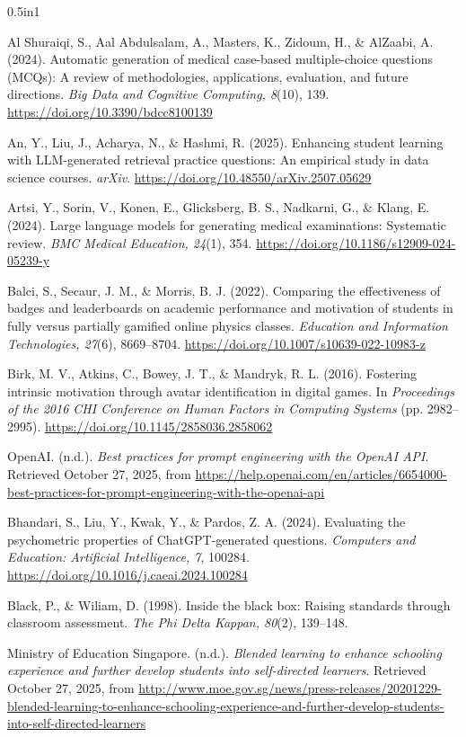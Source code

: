 \documentclass[
  12pt,
  a4paper,
]{report}
\begin{document}
\begingroup
\begin{hangparas}{0.5in}{1}

Al Shuraiqi, S., Aal Abdulsalam, A., Masters, K., Zidoum, H., \& AlZaabi, A. (2024). Automatic generation of medical case-based multiple-choice questions (MCQs): A review of methodologies, applications, evaluation, and future directions. \textit{Big Data and Cognitive Computing, 8}(10), 139. \url{https://doi.org/10.3390/bdcc8100139}

An, Y., Liu, J., Acharya, N., \& Hashmi, R. (2025). Enhancing student learning with LLM-generated retrieval practice questions: An empirical study in data science courses. \textit{arXiv}. \url{https://doi.org/10.48550/arXiv.2507.05629}

Artsi, Y., Sorin, V., Konen, E., Glicksberg, B. S., Nadkarni, G., \& Klang, E. (2024). Large language models for generating medical examinations: Systematic review. \textit{BMC Medical Education, 24}(1), 354. \url{https://doi.org/10.1186/s12909-024-05239-y}

Balci, S., Secaur, J. M., \& Morris, B. J. (2022). Comparing the effectiveness of badges and leaderboards on academic performance and motivation of students in fully versus partially gamified online physics classes. \textit{Education and Information Technologies, 27}(6), 8669--8704. \url{https://doi.org/10.1007/s10639-022-10983-z}

Birk, M. V., Atkins, C., Bowey, J. T., \& Mandryk, R. L. (2016). Fostering intrinsic motivation through avatar identification in digital games. In \textit{Proceedings of the 2016 CHI Conference on Human Factors in Computing Systems} (pp. 2982--2995). \url{https://doi.org/10.1145/2858036.2858062}

OpenAI. (n.d.). \textit{Best practices for prompt engineering with the OpenAI API}. Retrieved October 27, 2025, from \url{https://help.openai.com/en/articles/6654000-best-practices-for-prompt-engineering-with-the-openai-api}

Bhandari, S., Liu, Y., Kwak, Y., \& Pardos, Z. A. (2024). Evaluating the psychometric properties of ChatGPT-generated questions. \textit{Computers and Education: Artificial Intelligence, 7}, 100284. \url{https://doi.org/10.1016/j.caeai.2024.100284}

Black, P., \& Wiliam, D. (1998). Inside the black box: Raising standards through classroom assessment. \textit{The Phi Delta Kappan, 80}(2), 139--148.

Ministry of Education Singapore. (n.d.). \textit{Blended learning to enhance schooling experience and further develop students into self-directed learners}. Retrieved October 27, 2025, from \url{http://www.moe.gov.sg/news/press-releases/20201229-blended-learning-to-enhance-schooling-experience-and-further-develop-students-into-self-directed-learners}


\end{hangparas}
\end{document}

